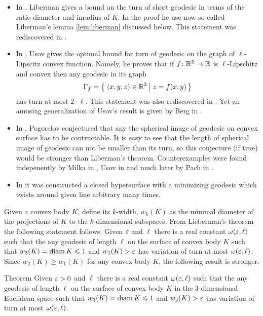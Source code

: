 \documentclass[a4paper,10pt]{amsart}
\begin{document}
\begin{itemize}
\item In \cite{liberman}, Liberman gives a bound on the turn of short geodesic in terms of the ratio diameter and inradius of $K$.
In the proof he use now so called Liberman's lemma \ref{lem:liberman} discussed below.
This statement was rediscovered in \cite{BKZ}.
\item In \cite{usov}, Usov gives the optimal bound for turn of geodesic on the graph of $\ell$-Lipscitz convex function. 
Namely, he proves that if $f\colon\mathbb{R}^2\to\mathbb{R}$ is $\ell$-Lipschitz and convex then any 
geodesic in its graph 
\[\Gamma_f=\set{(x,y,z)\in \RR^3}{z=f(x,y)}\] 
has turn at most $2\cdot \ell$.
This statement was also rediscovered in \cite{BKZ}.
Yet an amusing generalization of Usov's result is given by Berg in \cite{berg}.
\item In \cite{pogorelov}, Pogorelov conjectured that any the spherical image of geodesic on convex surface has to be contructable.
It is easy to see that the length of spherical image of geodesic can not be smaller than its turn, so this conjecture (if true) would be stronger than Liberman's theorem.
Counterexamples were found indepenently by Milka in \cite{milka}, 
Usov in \cite{usov-conj-pog} 
and much later by Pach in \cite{pach}.
\item In \cite{BKZ} it was constructed a closed hypersurface with a minimizing geodesic which twists around given line arbitrary many times.
\end{itemize}
 



Given a convex body $K$, define its $k$-width, $w_k(K)$
as the minimal diameter of the projections of $K$ to the $k$-dimensional subspaces.
From Lieberman's theorem the following statement follows. 
Given $\varepsilon$ and $\ell$ there is a real constant $\omega(\varepsilon,\ell)$ such that the any geodesic of length $\ell$ on the surface of convex body $K$ such that $w_3(K)=\operatorname{diam} K\leqslant 1$ and $w_1(K)>\varepsilon$ has variation of turn at most $\omega(\varepsilon,\ell)$.
Since $w_2(K)\ge w_1(K)$ for any convex body $K$,
the following result is stronger.

\begin{thm}{Theorem}\label{thm:dim=2}
Given $\varepsilon>0$ and $\ell$ there is a real constant $\omega(\varepsilon,\ell)$ such that the any geodesic of length $\ell$ on the surface of convex body $K$ in the 3-dimensional Euclidean space such that $w_3(K)=\operatorname{diam} K\leqslant 1$ and $w_2(K)>\varepsilon$ has variation of turn at most $\omega(\varepsilon,\ell)$.
\end{thm}
\end{document}
